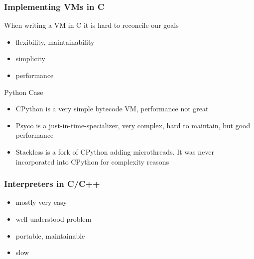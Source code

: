 \documentclass[utf8x]{beamer}
\begin{document}
\begin{frame}
  \frametitle{Implementing VMs in C}
  When writing a VM in C it is hard to reconcile our goals
  \begin{itemize}
  \item flexibility, maintainability
  \item simplicity
  \item performance
  \end{itemize}
  \pause
  \begin{block}{Python Case}
    \begin{itemize}
    \item \alert{CPython} is a very simple bytecode VM, performance not great
    \item \alert{Psyco} is a just-in-time-specializer, very complex, hard to
      maintain, but good performance
    \item \alert{Stackless} is a fork of CPython adding microthreads. It was
    never incorporated into CPython for complexity reasons
    \end{itemize}
  \end{block}
\end{frame}

\begin{frame}
  \frametitle{Interpreters in C/C++}
  \begin{itemize}
      \item mostly very easy
      \item well understood problem
      \item portable, maintainable
      \item slow
  \end{itemize}

\end{frame}


\end{document}
